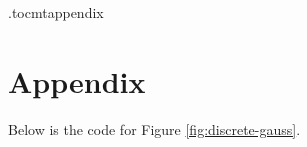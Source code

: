 \newpage
\appendix*
\newpage
\etocdepthtag.toc{mtappendix}
\tableofcontents
\newpage

\chapter{Appendix}
Below is the code for Figure \ref{fig:discrete-gauss}.
\label{app:code}


